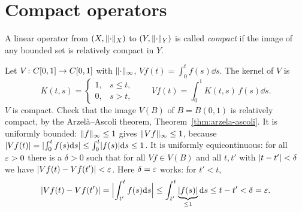 \section{Compact operators}

\begin{definition}\label{def:compact-operator}
A linear operator from $(X, \lVert\cdot\rVert_X)$ to $(Y, \lVert\cdot\rVert_Y)$ is
called \emph{compact} if the image of any bounded set is relatively compact
in $Y$.
\end{definition}

\begin{example}\label{ex:volterra}
Let $V \colon C[0,1] \to C[0,1]$ with $\lVert\cdot\rVert_\infty$,
$Vf(t) = \int_0^t f(s) \dd s$. The kernel of $V$ is
\[
  K(t,s) =
  \begin{cases}
    1, & s \le t, \\
    0, & s > t,
  \end{cases}
  \qquad
  Vf(t) = \int_0^1 K(t,s)\, f(s) \dd s .
\]
$V$ is compact. Check that the image $V(B)$ of $B = B(0,1)$ is relatively
compact, by the Arzelà--Ascoli theorem, Theorem~\ref{thm:arzela-ascoli}. It is
uniformly bounded: $\lVert f\rVert_\infty \le 1$ gives $\lVert Vf\rVert_\infty \le 1$,
because
$\lvert Vf(t)\rvert = \lvert\int_0^t f(s) \mathrm{d} s\rvert \le \int_0^t \lvert f(s)\rvert \mathrm{d} s \le 1$.
It is uniformly equicontinuous: for all $\varepsilon > 0$ there is a $\delta > 0$
such that for all $Vf \in V(B)$ and all $t, t'$ with $\lvert t - t'\rvert < \delta$
we have $\lvert Vf(t) - Vf(t')\rvert < \varepsilon$. Here $\delta = \varepsilon$ works: for
$t' < t$,
\[
  \lvert Vf(t) - Vf(t')\rvert = \Bigl\lvert \int_{t'}^{t} f(s) \mathrm{d} s \Bigr\rvert
  \le \int_{t'}^{t} \underbrace{\lvert f(s)\rvert}_{\le 1} \mathrm{d} s
  \le t - t' < \delta = \varepsilon .
\]
\end{example}

